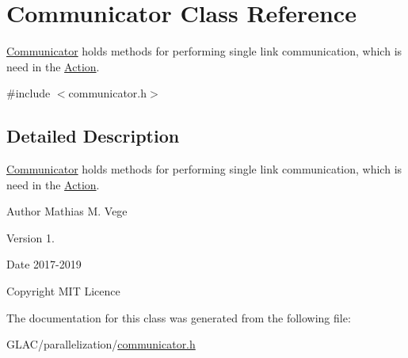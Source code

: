 \hypertarget{class_communicator}{}\section{Communicator Class Reference}
\label{class_communicator}


\mbox{\hyperlink{class_communicator}{Communicator}} holds methods for performing single link communication, which is need in the \mbox{\hyperlink{class_action}{Action}}.  




{\ttfamily \#include $<$communicator.\+h$>$}



\subsection{Detailed Description}
\mbox{\hyperlink{class_communicator}{Communicator}} holds methods for performing single link communication, which is need in the \mbox{\hyperlink{class_action}{Action}}. 

\begin{DoxyAuthor}{Author}
Mathias M. Vege 
\end{DoxyAuthor}
\begin{DoxyVersion}{Version}
1. 
\end{DoxyVersion}
\begin{DoxyDate}{Date}
2017-\/2019 
\end{DoxyDate}
\begin{DoxyCopyright}{Copyright}
M\+IT Licence 
\end{DoxyCopyright}


The documentation for this class was generated from the following file\+:\begin{DoxyCompactItemize}
\item 
G\+L\+A\+C/parallelization/\mbox{\hyperlink{communicator_8h}{communicator.\+h}}\end{DoxyCompactItemize}
